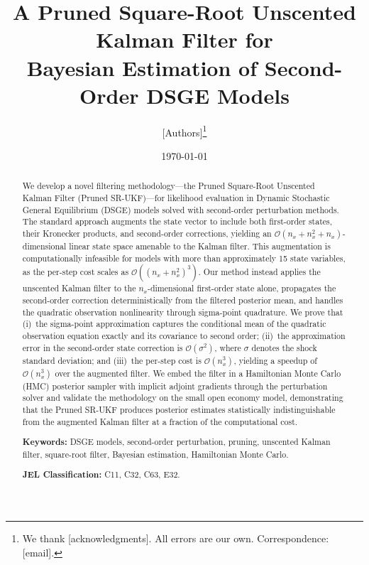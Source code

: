 \documentclass[12pt,a4paper]{article}
\title{\Large\textbf{A Pruned Square-Root Unscented Kalman Filter for\\
Bayesian Estimation of Second-Order DSGE Models}}
\author{%
[Authors]\thanks{%
We thank [acknowledgments]. All errors are our own.
Correspondence: [email].}
}
\date{\today}
\newcommand{\cO}{\mathcal{O}}
\begin{document}
\maketitle

\begin{abstract}
We develop a novel filtering methodology---the Pruned Square-Root
Unscented Kalman Filter (Pruned SR-UKF)---for likelihood evaluation
in Dynamic Stochastic General Equilibrium (DSGE) models solved with
second-order perturbation methods. The standard approach augments the
state vector to include both first-order states, their Kronecker
products, and second-order corrections, yielding an
$\cO(n_x + n_x^2 + n_x)$-dimensional linear state space amenable to
the Kalman filter. This augmentation is computationally infeasible
for models with more than approximately 15 state variables, as the
per-step cost scales as $\cO((n_x + n_x^2)^3)$. Our method instead
applies the unscented Kalman filter to the $n_x$-dimensional
first-order state alone, propagates the second-order correction
deterministically from the filtered posterior mean, and handles the
quadratic observation nonlinearity through sigma-point quadrature.
We prove that (i)~the sigma-point approximation captures the
conditional mean of the quadratic observation equation exactly and
its covariance to second order; (ii)~the approximation error in the
second-order state correction is $\cO(\sigma^2)$, where $\sigma$
denotes the shock standard deviation; and (iii)~the per-step cost
is $\cO(n_x^3)$, yielding a speedup of $\cO(n_x^3)$ over the
augmented filter. We embed the filter in a Hamiltonian Monte Carlo
(HMC) posterior sampler with implicit adjoint gradients through the
perturbation solver and validate the methodology on the
\citet{schmitt2003closing} small open economy model, demonstrating
that the Pruned SR-UKF produces posterior estimates statistically
indistinguishable from the augmented Kalman filter at a fraction of
the computational cost.

\medskip
\noindent\textbf{Keywords:}
DSGE models, second-order perturbation, pruning, unscented Kalman filter,
square-root filter, Bayesian estimation, Hamiltonian Monte Carlo.

\medskip
\noindent\textbf{JEL Classification:} C11, C32, C63, E32.
\end{abstract}

\newpage
\tableofcontents
\newpage

\end{document}
